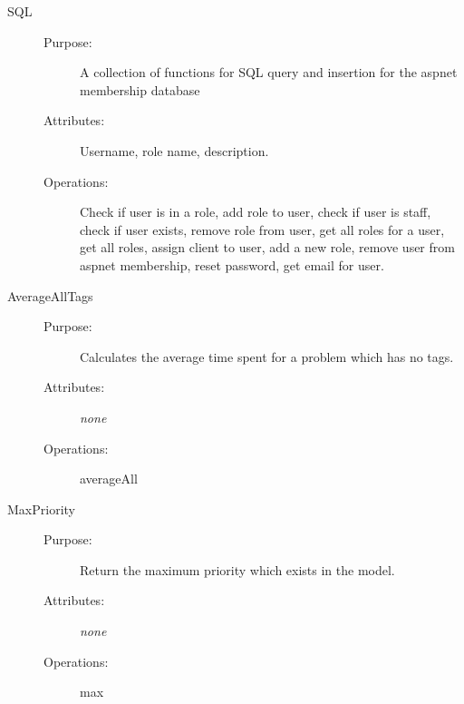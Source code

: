 \begin{description}
\item[SQL]\hfill
\begin{description}
\item[Purpose:]A collection of functions for SQL query and insertion for the aspnet membership database
\item[Attributes:]Username, role name, description.
\item[Operations:]Check if user is in a role, add role to user, check if user is staff, check if user exists, remove role from user, get all roles for a user, get all roles, assign client to user, add a new role, remove user from aspnet membership, reset password, get email for user.
\end{description}
\end{description}

\begin{description}
\item[AverageAllTags]\hfill
\begin{description}
\item[Purpose:]Calculates the average time spent for a problem which has no tags.
\item[Attributes:]\textit{none}
\item[Operations:]averageAll
\end{description}
\end{description}

\begin{description}
\item[MaxPriority]\hfill
\begin{description}
\item[Purpose:] Return the maximum priority which exists in the model.
\item[Attributes:]\textit{none}
\item[Operations:]max
\end{description}
\end{description}